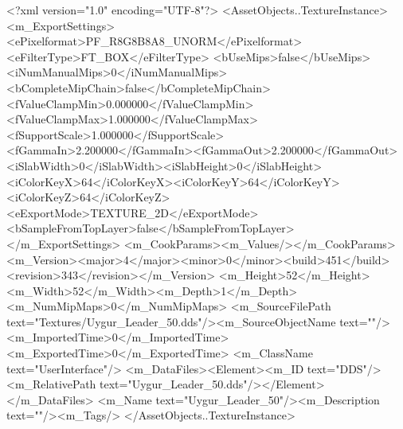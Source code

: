 <?xml version="1.0" encoding="UTF-8"?>
<AssetObjects..TextureInstance>
  <m_ExportSettings>
    <ePixelformat>PF_R8G8B8A8_UNORM</ePixelformat><eFilterType>FT_BOX</eFilterType>
    <bUseMips>false</bUseMips><iNumManualMips>0</iNumManualMips><bCompleteMipChain>false</bCompleteMipChain>
    <fValueClampMin>0.000000</fValueClampMin><fValueClampMax>1.000000</fValueClampMax><fSupportScale>1.000000</fSupportScale>
    <fGammaIn>2.200000</fGammaIn><fGammaOut>2.200000</fGammaOut><iSlabWidth>0</iSlabWidth><iSlabHeight>0</iSlabHeight>
    <iColorKeyX>64</iColorKeyX><iColorKeyY>64</iColorKeyY><iColorKeyZ>64</iColorKeyZ>
    <eExportMode>TEXTURE_2D</eExportMode><bSampleFromTopLayer>false</bSampleFromTopLayer>
  </m_ExportSettings>
  <m_CookParams><m_Values/></m_CookParams>
  <m_Version><major>4</major><minor>0</minor><build>451</build><revision>343</revision></m_Version>
  <m_Height>52</m_Height><m_Width>52</m_Width><m_Depth>1</m_Depth><m_NumMipMaps>0</m_NumMipMaps>
  <m_SourceFilePath text="Textures/Uygur_Leader_50.dds"/><m_SourceObjectName text=""/>
  <m_ImportedTime>0</m_ImportedTime><m_ExportedTime>0</m_ExportedTime>
  <m_ClassName text="UserInterface"/>
  <m_DataFiles><Element><m_ID text="DDS"/><m_RelativePath text="Uygur_Leader_50.dds"/></Element></m_DataFiles>
  <m_Name text="Uygur_Leader_50"/><m_Description text=""/><m_Tags/>
</AssetObjects..TextureInstance>
